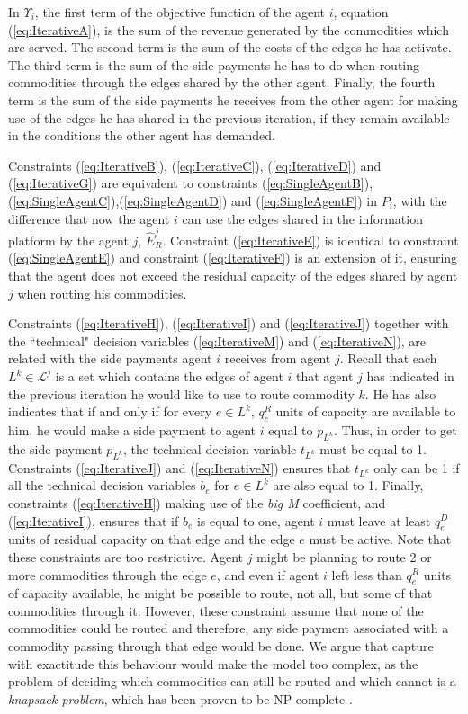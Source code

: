 \documentclass[authoryear]{elsarticle}
\begin{document}
In $\Upsilon_i$, the first term of the objective function of the agent $i$, equation (\ref{eq:IterativeA}), is the sum of the revenue generated by the commodities which are served. The second term is the sum of the costs of the edges he has activate. The third term is the sum of the side payments he has to do when routing commodities through the edges shared by the other agent. Finally, the fourth term is the sum of the side payments he receives from the other agent for making use of the edges he has shared in the previous iteration, if they remain available in the conditions the other agent has demanded.

Constraints (\ref{eq:IterativeB}), (\ref{eq:IterativeC}), (\ref{eq:IterativeD}) and (\ref{eq:IterativeG}) are equivalent to constraints (\ref{eq:SingleAgentB}),(\ref{eq:SingleAgentC}),(\ref{eq:SingleAgentD}) and (\ref{eq:SingleAgentF}) in $P_i$, with the difference that now the agent $i$ can use the edges shared in the information platform by the agent $j$, $\widehat{E}_R^j$. Constraint (\ref{eq:IterativeE}) is identical to constraint (\ref{eq:SingleAgentE}) and constraint (\ref{eq:IterativeF}) is an extension of it, ensuring that the agent does not exceed the residual capacity of the edges shared by agent $j$ when routing his commodities.

Constraints (\ref{eq:IterativeH}),  (\ref{eq:IterativeI}) and (\ref{eq:IterativeJ}) together with the ``technical" decision variables (\ref{eq:IterativeM}) and (\ref{eq:IterativeN}), are related with the side payments agent $i$ receives from agent $j$. Recall that each $L^k \in \mathcal{L}^j$ is a set which contains the edges of agent $i$ that agent $j$ has indicated in the previous iteration he would like to use to route commodity $k$. He has also indicates that if and only if for every $e \in L^k$, $q_e^R$ units of capacity are available to him, he would make a side payment to agent $i$ equal to $p_{L^k}$. Thus, in order to get the side payment $p_{L^k}$, the technical decision variable $t_{L^k}$ must be equal to 1. Constraints (\ref{eq:IterativeJ}) and (\ref{eq:IterativeN}) ensures that $t_{L^k}$ only can be 1 if all the technical decision variables $b_e$ for $e \in L^k$ are also equal to 1. Finally, constraints (\ref{eq:IterativeH})  making use of the \emph{big M} coefficient, and (\ref{eq:IterativeI}), ensures that if $b_e$ is equal to one, agent $i$ must leave at least $q_e^D$ units of residual capacity on that edge and the edge $e$ must be active. Note that these constraints are too restrictive. Agent $j$ might be planning to route 2 or more commodities through the edge $e$, and even if agent $i$ left less than $q_e^R$ units of capacity available, he might be possible to route, not all, but some of that commodities through it. However, these constraint assume that none of the commodities could be routed and therefore, any side payment associated with a commodity passing through that edge would be done. We argue that capture with exactitude this behaviour would make the model too complex, as the problem of deciding which commodities can still be routed and which cannot is a \emph{knapsack problem}, which has been proven to be NP-complete \citep{KARP1972}.
\end{document}
